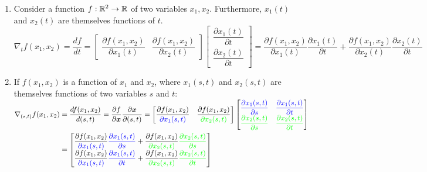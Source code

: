 \begin{enumerate}
    \item Consider a function $f : \mathbb{R}^2 \to \mathbb{R}$ of two variables $x_1, x_2$. 
    Furthermore, $x_1(t)$ and $x_2(t)$ are themselves functions of $t$. 
    \\
    $
        \nabla_t f(x_1, x_2)
        = \dfrac{df}{dt}
        = \begin{bmatrix}
            \dfrac{\partial f(x_1, x_2)}{\partial x_1(t)} &
            \dfrac{\partial f(x_1, x_2)}{\partial x_2(t)}
        \end{bmatrix}
        \begin{bmatrix}
            \dfrac{\partial x_1(t)}{\partial t} \\
            \dfrac{\partial x_2(t)}{\partial t}
        \end{bmatrix}
        = \dfrac{\partial f(x_1, x_2)}{\partial x_1(t)} \dfrac{\partial x_1(t)}{\partial t}
        + \dfrac{\partial f(x_1, x_2)}{\partial x_2(t)} \dfrac{\partial x_2(t)}{\partial t}
    $
    \hfill \cite{mfml/book/mml/Deisenroth-Faisal-Ong}

    \item If $f (x_1, x_2)$ is a function of $x_1$ and $x_2$, where $x_1(s, t)$ and $x_2(s, t)$ are themselves functions of two variables $s$ and $t$:
    \\
    $
        \begin{aligned}
        \nabla_{(s,t)} f(x_1, x_2)
        &= \dfrac{df(x_1, x_2)}{d(s,t)}
        = \dfrac{\partial f}{\partial \bm{x}} \dfrac{\partial \bm{x}}{\partial (s,t)}
        = \begin{bmatrix}
            \dfrac{\partial f(x_1, x_2)}{\textcolor{blue}{\partial x_1(s,t)}} &
            \dfrac{\partial f(x_1, x_2)}{\textcolor{green}{\partial x_2(s,t)}}
        \end{bmatrix}
        \begin{bmatrix}
            \textcolor{blue}{\dfrac{\partial x_1(s,t)}{\partial s}} & \textcolor{blue}{\dfrac{\partial x_1(s,t)}{\partial t}} \\
            \textcolor{green}{\dfrac{\partial x_2(s,t)}{\partial s}} & \textcolor{green}{\dfrac{\partial x_2(s,t)}{\partial t}}
        \end{bmatrix}
        \\
        &= 
        \begin{bmatrix}
            \dfrac{\partial f(x_1, x_2)}{\textcolor{blue}{\partial x_1(s,t)}}
            \textcolor{blue}{\dfrac{\partial x_1(s,t)}{\partial s}} +
            \dfrac{\partial f(x_1, x_2)}{\textcolor{green}{\partial x_2(s,t)}}
            \textcolor{green}{\dfrac{\partial x_2(s,t)}{\partial s}} \\ 
            \dfrac{\partial f(x_1, x_2)}{\textcolor{blue}{\partial x_1(s,t)}}
            \textcolor{blue}{\dfrac{\partial x_1(s,t)}{\partial t}} +
            \dfrac{\partial f(x_1, x_2)}{\textcolor{green}{\partial x_2(s,t)}}
            \textcolor{green}{\dfrac{\partial x_2(s,t)}{\partial t}}
        \end{bmatrix}
        \end{aligned}
    $
    \hfill \cite{mfml/book/mml/Deisenroth-Faisal-Ong}
    

\end{enumerate}
